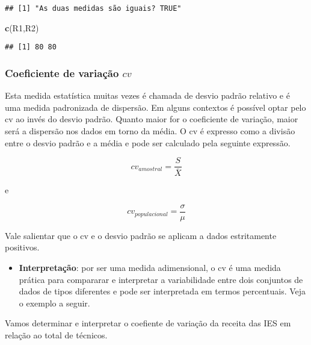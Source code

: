 \documentclass[11pt,]{style/krantz}
\makeatletter
\newenvironment{Shaded}{\begin{snugshade}}{\end{snugshade}}
\newcommand{\KeywordTok}[1]{\textcolor[rgb]{0.13,0.29,0.53}{\textbf{#1}}}
\newcommand{\NormalTok}[1]{#1}
\providecommand{\tightlist}{%
  \setlength{\itemsep}{0pt}\setlength{\parskip}{0pt}}
\renewenvironment{quote}{\begin{VF}}{\end{VF}}
\newenvironment{kframe}{%
\medskip{}
\setlength{\fboxsep}{.8em}
 \def\at@end@of@kframe{}%
 \ifinner\ifhmode%
  \def\at@end@of@kframe{\end{minipage}}%
  \begin{minipage}{\columnwidth}%
 \fi\fi%
 \def\FrameCommand##1{\hskip\@totalleftmargin \hskip-\fboxsep
 \colorbox{shadecolor}{##1}\hskip-\fboxsep
     \hskip-\linewidth \hskip-\@totalleftmargin \hskip\columnwidth}%
 \MakeFramed {\advance\hsize-\width
   \@totalleftmargin\z@ \linewidth\hsize
   \@setminipage}}%
 {\par\unskip\endMakeFramed%
 \at@end@of@kframe}
\renewenvironment{Shaded}{\begin{kframe}}{\end{kframe}}
\theoremstyle{definition}
\theoremstyle{definition}
\theoremstyle{definition}
\theoremstyle{remark}
\let\BeginKnitrBlock\begin \let\EndKnitrBlock\end
\makeatother
\begin{document}
\begin{verbatim}
## [1] "As duas medidas são iguais? TRUE"
\end{verbatim}

\begin{Shaded}
\begin{Highlighting}[]
\KeywordTok{c}\NormalTok{(R1,R2)}
\end{Highlighting}
\end{Shaded}

\begin{verbatim}
## [1] 80 80
\end{verbatim}

\hypertarget{coeficiente-de-variacao-cv}{%
\subsubsection{\texorpdfstring{Coeficiente de variação \(cv\)}{Coeficiente de variação cv}}\label{coeficiente-de-variacao-cv}}

Esta medida estatística muitas vezes é chamada de desvio padrão relativo e é uma medida padronizada de dispersão. Em alguns contextos é possível optar pelo cv ao invés do desvio padrão. Quanto maior for o coeficiente de variação, maior será a dispersão nos dados em torno da média. O cv é expresso como a divisão entre o desvio padrão e a média e pode ser calculado pela seguinte expressão.

\[cv_{amostral} = \frac{S}{\bar X}\]

e

\[cv_{populacional} = \frac{\sigma}{\mu}\]

\begin{quote}
Vale salientar que o cv e o desvio padrão se aplicam a dados estritamente positivos.
\end{quote}

\begin{itemize}
\tightlist
\item
  \textbf{Interpretação}: por ser uma medida adimensional, o cv é uma medida prática para compararar e interpretar a variabilidade entre dois conjuntos de dados de tipos diferentes e pode ser interpretada em termos percentuais. Veja o exemplo a seguir.
\end{itemize}

\BeginKnitrBlock{example}
\protect\hypertarget{exm:unnamed-chunk-67}{}{\label{exm:unnamed-chunk-67} }Vamos determinar e interpretar o coefiente de variação da receita das IES em relação ao total de técnicos.
\EndKnitrBlock{example}
\end{document}

